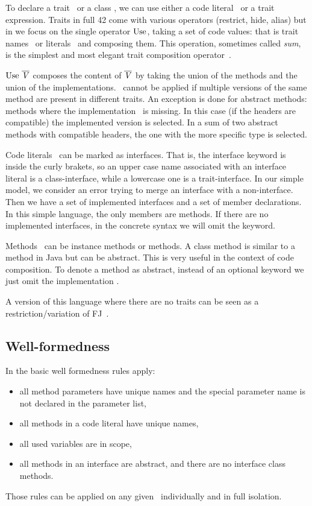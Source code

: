 To declare a trait \mTD\ or a class \mCD, we can use either a code literal \mL\ or a trait
expression.  Traits in full 42 come with various operators (restrict, hide,
alias) but in \name we focus on the single operator 
$\use$, taking a set
of code values: that is trait names \mt\ or literals \mL\ and composing them.  This operation, sometimes called \emph{sum}, is the simplest and most elegant
trait composition operator~.  

$\use\ \overline\mV$ composes the content of $\overline{\mathit{V}}$
by taking the union of the methods and the union of the
implementations.
\use\ cannot be applied if multiple versions of the same method are
present in different traits.  An exception is done for abstract methods:
methods where the implementation \me\ is missing. In this case (if the
headers are compatible) the implemented version is selected.  In a sum
of two abstract methods with compatible headers, the one with the more
specific type is selected.

Code literals \mL\ can be marked as interfaces. 
That is, the interface keyword is inside the curly brakets, so an upper case name associated with an interface literal is a class-interface, while a lowercase one is a trait-interface.
In our simple model, we consider an error trying to merge an interface with a non-interface.
 Then we have a set of implemented interfaces and a set of member
  declarations. In this simple language, the only members are methods.
If there are no implemented interfaces, in the concrete syntax we will omit the \Q@implements@ keyword.

Methods \mMD~can be instance methods or \Q@class@ methods. A class method is similar to a \Q@static@ method in Java but can be abstract. This is very useful in the context of code composition.
To denote a method as abstract, instead of an optional keyword we just omit the implementation \me.

A version of this language where there are no traits can be seen 
as a restriction/variation of FJ~\cite{igarashi2001featherweight}.

\subsection{Well-formedness}
In \name the basic well formedness rules apply:
\begin{itemize}
\item all method parameters have unique names and the special parameter name \Q@this@ is not declared
 in the parameter list,
\item all methods in a code literal have unique names,
\item all used variables are in scope,
\item all methods in an interface are abstract, and there are no interface class methods.
\end{itemize}
Those rules can be applied on any given \mL~individually and in full isolation.

